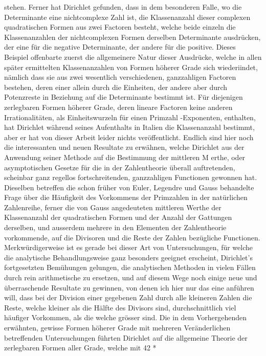 \documentclass[11pt]{article}
\begin{document}
\noindent stehen. Ferner hat Dirichlet gefunden, dass in dem besonderen Falle, wo die Determinante eine nichtcomplexe Zahl ist, die Klassenanzahl dieser complexen quadratischen Formen aus zwei Factoren besteht, welche beide einzeln die Klassenanzahlen der nichtcomplexen Formen derselben Determinante ausdrücken, der eine für die negative Determinante, der andere für die positive. Dieses Beispiel offenbarte zuerst die allgemeinere Natur dieser Ausdrücke, welche in allen später ermittelten Klassenanzahlen von Formen höherer Grade sich wiederiindet, nämlich dass sie aus zwei wesentlich verschiedenen, ganzzahligen Factoren bestehen, deren einer allein durch die Einheiten, der andere aber durch Potenzreste in Beziehung auf die Determinante bestimmt ist. Für diejenigen zerlegbaren Formen höherer Grade, deren lineare Factoren keine anderen Irrationalitäten, als Einheitswurzeln für einen Primzahl -Exponenten, enthalten, hat Dirichlet während seines Aufenthalts in Italien die Klassenanzahl bestimmt, aber er hat von dieser Arbeit leider nichts veröffentlicht. Endlich sind hier noch die interessanten und neuen Resultate zu erwähnen, welche Dirichlet aus der Anwendung seiner Methode auf die Bestimmung der mittleren M erthe, oder asymptotischen Gesetze für die in der Zahlentheorie überall auftretenden, scheinbar ganz regellos fortschreitenden, ganzzahligen Functionen gewonnen hat. Dieselben betreffen die schon früher von Euler, Legendre und Gauss behandelte Frage über die Häufigkeit des Vorkommens der Primzahlen in der natürlichen Zahlenreihe, ferner die von Gauss angedeuteten mittleren Werthe der Klassenanzahl der quadratischen Formen und der Anzahl der Gattungen derselben, und ausserdem mehrere in den Elementen der Zahlentheorie vorkommende, auf die Divisoren und die Reste der Zahlen bezügliche Functionen. Merkwürdigerweise ist es gerade bei dieser Art von Untersuchungen, für welche die analytische Behandlungsweise ganz besonders geeignet erscheint, Dirichlet’s fortgesetzten Bemühungen gelungen, die analytischen Methoden in vielen Fällen durch rein arithmetische zu ersetzen, und auf diesem Wege noch einige neue und überraschende Resultate zu gewinnen, von denen ich hier nur das eine anführen will, dass bei der Division einer gegebenen Zahl durch alle kleineren Zahlen die Reste, welche kleiner als die Hälfte des Divisors sind, durchschnittlich viel häufiger Vorkommen, als die welche grösser sind. Die in dem Vorhergehenden erwähnten, gewisse Formen höherer Grade mit mehreren Veränderlichen betreffenden Untersuchungen führten Dirichlet auf die allgemeine Theorie der zerlegbaren Formen aller Grade, welche mit 42 *
\par
\end{document}
